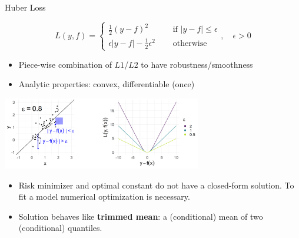 \documentclass[11pt,compress,t,notes=noshow, xcolor=table]{beamer}
\begin{document}
\begin{vbframe}{Huber Loss}

\vspace*{-0.5cm}

$$
L(y,f) = \begin{cases}
  \frac{1}{2}(y - f)^2  & \text{ if } |y - f| \le \epsilon \\
  \epsilon |y - f|-\frac{1}{2}\epsilon^2 \quad & \text{ otherwise }
  \end{cases}, \quad \epsilon > 0
$$

\begin{itemize}
\item Piece-wise combination of $L1$/$L2$ to have robustness/smoothness
\item Analytic properties: convex, differentiable (once)
\end{itemize}



\begin{center}
\includegraphics[width = 0.65\textwidth]{figure/loss_huber_plot.png}
\end{center}

\vspace*{-0.2cm}

\begin{itemize}
\item Risk minimizer and optimal constant do not have a closed-form solution. To fit a model numerical optimization is necessary. 
\item Solution behaves like \textbf{trimmed mean}: a (conditional) mean of two (conditional) quantiles. %
\end{itemize}


\end{vbframe}
\end{document}
